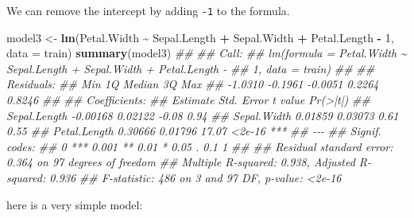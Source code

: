 \documentclass[
  notitlepage]{book}
\newenvironment{Shaded}{\begin{snugshade}}{\end{snugshade}}
\newcommand{\CommentTok}[1]{\textcolor[rgb]{0.56,0.35,0.01}{\textit{#1}}}
\newcommand{\DataTypeTok}[1]{\textcolor[rgb]{0.13,0.29,0.53}{#1}}
\newcommand{\DecValTok}[1]{\textcolor[rgb]{0.00,0.00,0.81}{#1}}
\newcommand{\KeywordTok}[1]{\textcolor[rgb]{0.13,0.29,0.53}{\textbf{#1}}}
\newcommand{\NormalTok}[1]{#1}
\newcommand{\OperatorTok}[1]{\textcolor[rgb]{0.81,0.36,0.00}{\textbf{#1}}}
\newcommand{\StringTok}[1]{\textcolor[rgb]{0.31,0.60,0.02}{#1}}
\begin{document}
We can remove the intercept by adding \texttt{-1} to the formula.

\begin{Shaded}
\begin{Highlighting}[]
\NormalTok{model3 \textless{}{-}}\StringTok{ }\KeywordTok{lm}\NormalTok{(Petal.Width }\OperatorTok{\textasciitilde{}}\StringTok{ }\NormalTok{Sepal.Length }\OperatorTok{+}\StringTok{ }
\StringTok{               }\NormalTok{Sepal.Width }\OperatorTok{+}\StringTok{ }\NormalTok{Petal.Length }\OperatorTok{{-}}\StringTok{ }\DecValTok{1}\NormalTok{,}
             \DataTypeTok{data =}\NormalTok{ train)}
\KeywordTok{summary}\NormalTok{(model3)}
\CommentTok{\#\# }
\CommentTok{\#\# Call:}
\CommentTok{\#\# lm(formula = Petal.Width \textasciitilde{} Sepal.Length + Sepal.Width + Petal.Length {-} }
\CommentTok{\#\#     1, data = train)}
\CommentTok{\#\# }
\CommentTok{\#\# Residuals:}
\CommentTok{\#\#     Min      1Q  Median      3Q     Max }
\CommentTok{\#\# {-}1.0310 {-}0.1961 {-}0.0051  0.2264  0.8246 }
\CommentTok{\#\# }
\CommentTok{\#\# Coefficients:}
\CommentTok{\#\#              Estimate Std. Error t value Pr(\textgreater{}|t|)    }
\CommentTok{\#\# Sepal.Length {-}0.00168    0.02122   {-}0.08     0.94    }
\CommentTok{\#\# Sepal.Width   0.01859    0.03073    0.61     0.55    }
\CommentTok{\#\# Petal.Length  0.30666    0.01796   17.07   \textless{}2e{-}16 ***}
\CommentTok{\#\# {-}{-}{-}}
\CommentTok{\#\# Signif. codes:  }
\CommentTok{\#\# 0 \textquotesingle{}***\textquotesingle{} 0.001 \textquotesingle{}**\textquotesingle{} 0.01 \textquotesingle{}*\textquotesingle{} 0.05 \textquotesingle{}.\textquotesingle{} 0.1 \textquotesingle{} \textquotesingle{} 1}
\CommentTok{\#\# }
\CommentTok{\#\# Residual standard error: 0.364 on 97 degrees of freedom}
\CommentTok{\#\# Multiple R{-}squared:  0.938,  Adjusted R{-}squared:  0.936 }
\CommentTok{\#\# F{-}statistic:  486 on 3 and 97 DF,  p{-}value: \textless{}2e{-}16}
\end{Highlighting}
\end{Shaded}

here is a very simple model:
\end{document}
